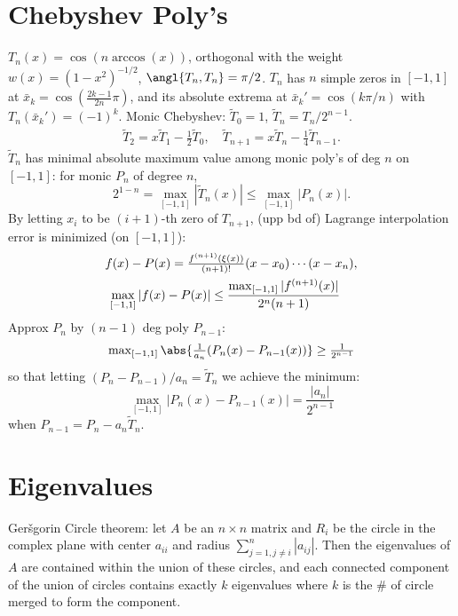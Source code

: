 \documentclass[b4paper,10pt]{memoir}
\begin{document}
\begin{multicols*}{3}
    \section{Chebyshev Poly's}
    \s $T_n(x) = \cos(n \arccos(x))$, orthogonal with the weight $w(x) = (1-x^2)^{-1/2}$, $\angl{T_n,T_n} = \pi/2$.\nl
    \s $T_n$ has $n$ simple zeros in $[-1,1]$ at $\bar x_k = \cos(\frac{2k-1}{2n}\pi)$, and its absolute extrema at $\bar x_k'  = \cos(k\pi/n)$ with $T_n(\bar x_k') = (-1)^k$. \nl
    \s Monic Chebyshev: $\tilde T_0=1$, $\tilde T_n = T_n / 2^{n-1}$.
    \begin{align*}
       \textstyle \tilde T_2 = x\tilde T_1-\frac 12 \tilde T_0,\quad \tilde T_{n+1} = x\tilde T_n-\frac 14 \tilde T_{n-1}.
    \end{align*}
    \s $\tilde T_n$ has minimal absolute maximum value among monic poly's of deg $n$ on $[-1,1]$: for monic $P_n$ of degree $n$,
    \[ 2^{1-n} = \max_{[-1,1]} |\tilde T_n(x)|\le \max_{[-1,1]}|P_n(x)|. \]
    \s By letting $x_i$ to be $(i+1)$-th zero of $T_{n+1}$, (upp bd of) Lagrange interpolation error is minimized (on $[-1,1]$):
    \begin{align*}
       \textstyle f(x)-P(x) = \frac{f^{(n+1)} (\xi(x))}{(n+1)!}(x-x_0)\cdots (x-x_n),\\
        \max_{[-1,1]}|f(x)-P(x)| \le \frac{\max_{[-1,1]} |f^{(n+1)}(x)|}{2^n(n+1)}\mkern25mu
    \end{align*}
    \s Approx $P_n$ by $(n-1)$ deg poly $P_{n-1}$:
    \begin{align*}
        \textstyle  \max_{[-1,1]}\abs{\frac 1{a_n}(P_n(x) - P_{n-1}(x))} \ge \frac 1{2^{n-1}}
    \end{align*}
    so that letting $(P_n - P_{n-1})/a_n = \tilde T_n$ we achieve the minimum:
    \[ \max_{[-1,1]} |P_n(x) - P_{n-1}(x)| = \frac{|a_n|}{2^{n-1}} \]
    when $P_{n-1} = P_n - a_n \tilde T_n$.

    \setcounter{chapter}{9}
    \setcounter{section}{0}
    \section{Eigenvalues}
    \s Ger\v sgorin Circle theorem: let $A$ be an $n\times n$ matrix and $R_i$ be the circle in the complex plane with center $a_{ii}$ and radius $\sum_{j=1,j\ne i}^n |a_{ij}|$. Then the eigenvalues of $A$ are contained within the union of these circles, and each connected component of the union of circles contains exactly $k$ eigenvalues where $k$ is the \# of circle merged to form the component.


\end{multicols*}
\end{document}
